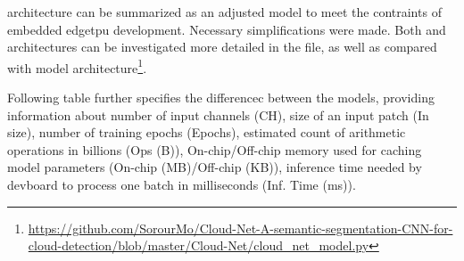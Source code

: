 {\begin{itemize}
\end{itemize}

 architecture can be summarized as an adjusted  model to meet the contraints of embedded \gls{edgetpu} development.
Necessary simplifications were made. Both  and  architectures can be investigated more detailed in the
 file,
as well as compared with  model
architecture\footnote{\url{https://github.com/SorourMo/Cloud-Net-A-semantic-segmentation-CNN-for-cloud-detection/blob/master/Cloud-Net/cloud_net_model.py}}.

Following table further specifies the differencec between the models, providing information about number of input channels (CH),
size of an input patch (In size), number of training epochs (Epochs), estimated count of arithmetic operations in billions (Ops (B)),
On-chip/Off-chip memory used for caching model parameters (On-chip (MB)/Off-chip (KB)),
inference time needed by \gls{devboard} to process one batch in milliseconds (Inf. Time (ms)).

\begin{table}[h!]
\centering
\caption{Comparison of model properties and deployment metrics}
\label{tab:model_comparison}
\renewcommand{\arraystretch}{1.3}
\end{table}


}
